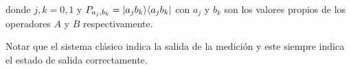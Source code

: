 donde $j,k=0,1$ y $P_{a_j,b_k}=|a_j b_k\rangle \langle a_j b_k|$ con $a_j$ y $b_k$ son los valores propios de los operadores $A$ y $B$ respectivamente.

Notar que el sistema clásico indica la salida de la medición y este siempre indica el estado de salida correctamente.


\begin{comment}
\subsubsection{Segunda alternativa} %
Para la segunda alternativa se realiza una medición ideal en el sistema cuántico y en el sistema clásico ocurre una confusión de los resultados, por ello se aplica el operador difuso al sistema clásico\begin{equation}
    \begin{split}
        \mathcal{I}_2(\rho)&=\sum_{j,k}\mathcal{F}(P_{a_j,b_k})\otimes P_{a_j,b_k} \rho P_{a_j,b_k}\\
        &=\sum_{j,k}[pP_{a_j,b_k}+(1-p)SP_{a_j,b_k}S^\dagger]\otimes P_{a_j,b_k} \rho P_{a_j,b_k}\\
        &=\sum_{j,k} pP_{a_j,b_k} \otimes P_{a_j,b_k} \rho P_{a_j,b_k}+(1-p)SP_{a_j,b_k}S^\dagger\otimes P_{a_j,b_k} \rho P_{a_j,b_k}\\
        &=\sum_{j,k} pP_{a_j,b_k} \otimes P_{a_j,b_k} \rho P_{a_j,b_k}+(1-p)P_{b_k,a_j}\otimes P_{a_j,b_k} \rho P_{a_j,b_k}.\\
    \end{split}
\end{equation} 
Al aplicarle el operador difuso al sistema clásico se puede notar que aunque el apuntador indique que el resultado medido fuera el estado $|b_k a_j\ra$ es posible que con una probabilidad $(1-p)$, el estado de salida real sea $|a_j b_k\ra$.



\subsubsection{Tercera alternativa} %
Para la tercera alternativa se considera un tipo medición difusa diferente a las dos anteriores. En esta alternativa se asume que con una probabilidad $q$ se realiza una medida proyectiva ideal, pero con una probabilidad $(1-q)$ se realiza una medición en la que no es posible distinguir entre los posibles estados.


Sea $S$ el conjunto de pares ordenados $(j,k)$ de índices de  valores propios tales que el primer índice indica un valor propio del operador $A$ y el segundo índice indica algún valor propio del operador $B$. Sus respectivos operadores de proyección tienen la característica que  $|a_j b_k \rala a_j b_k|\ne|b_k a_j \rala b_k a_j |$. Los valores que toman $j$ y $k$ pueden ser $0$ o $1$. Entonces se introduce un nuevo operador de proyección \[P^{s}_{a_j,b_k}=|a_j b_k\rala a_j b_k|+|b_k a_j\rala b_k a_j|,\] además los estados $|a_j b_k\rala a_j b_k|$ son ortogonales con $|b_k a_j\rala b_k a_j|$. El operador $P^s_{a_j,b_k}$ se interpreta como la falta de conocimiento si el estado se encuentra en $|a_j b_k\ra$ o en $|b_k a_j\ra$. 


\end{comment}
